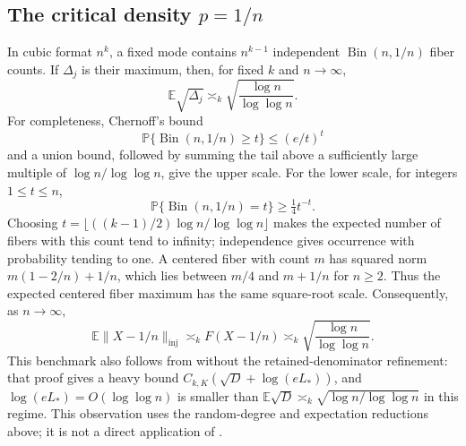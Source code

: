 \documentclass[11pt]{article}
\theoremstyle{spaced}
\theoremstyle{remark}
\numberwithin{equation}{section}
\newcommand{\E}{\mathbb E}
\newcommand{\Pp}{\mathbb P}
\newcommand{\inj}{\mathrm{inj}}
\begin{document}
\subsection{The critical density \texorpdfstring{$p=1/n$}{p=1/n}}
\label{app:critical}

In cubic format $n^k$, a fixed mode contains $n^{k-1}$ independent $\operatorname{Bin}(n,1/n)$ fiber counts. If $\Delta_j$ is their maximum, then, for fixed $k$ and $n\to\infty$,
\[
 \E\sqrt{\Delta_j}\asymp_k\sqrt{\frac{\log n}{\log\log n}}.
\]
For completeness, Chernoff's bound
\[
 \Pp\{\operatorname{Bin}(n,1/n)\geq t\}\leq(e/t)^t
\]
and a union bound, followed by summing the tail above a sufficiently
large multiple of $\log n/\log\log n$, give the upper scale. For the lower scale, for integers $1\leq t\leq n$,
\[
 \Pp\{\operatorname{Bin}(n,1/n)=t\}\geq\tfrac14t^{-t}.
\]
Choosing $t=\lfloor((k-1)/2)\log n/\log\log n\rfloor$ makes the expected number of fibers with this count tend to infinity; independence gives occurrence with probability tending to one. A centered fiber with count $m$ has squared norm
$m(1-2/n)+1/n$, which lies between $m/4$ and $m+1/n$ for $n\ge2$.
Thus the expected centered fiber maximum has the same square-root scale. Consequently, as $n\to\infty$,
\[
 \E\|X-1/n\|_{\inj}\asymp_k F(X-1/n)
 \asymp_k\sqrt{\frac{\log n}{\log\log n}}.
\]
This benchmark also follows from \cite[proof of Proposition~4.6]{ZZ}
without the retained-denominator refinement: that proof gives a heavy bound $C_{k,K}(\sqrt D+\log(eL_*))$, and $\log(eL_*)=O(\log\log n)$ is smaller than
$\E\sqrt D\asymp_k\sqrt{\log n/\log\log n}$ in this regime.
This observation uses the random-degree and expectation reductions above;
it is not a direct application of \cite[Theorem~2.1]{ZZ}.
\end{document}
